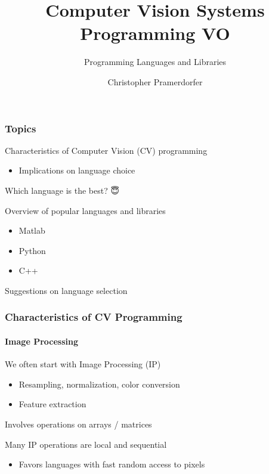 \documentclass[xetex,professionalfont]{beamer}
\title{Computer Vision Systems Programming VO}
\subtitle{Programming Languages and Libraries}
\author{Christopher Pramerdorfer}
\institute{Computer Vision Lab, Vienna University of Technology}
\begin{document}

\begin{frame}
\maketitle
\end{frame}


\begin{frame}
\frametitle{Topics}

Characteristics of Computer Vision (CV) programming
\begin{itemize}
	\item Implications on language choice
\end{itemize}

\bigskip
Which language is the best? {\DejaSans 😇}

\bigskip
Overview of popular languages and libraries
\begin{itemize}
	\item Matlab
	\item Python
	\item C++
\end{itemize}

\bigskip
Suggestions on language selection

\end{frame}


\begin{frame}
\frametitle{Characteristics of CV Programming}
\framesubtitle{Image Processing}

We often start with Image Processing (IP)
\begin{itemize}
	\item Resampling, normalization, color conversion
	\item Feature extraction
\end{itemize}

\bigskip
Involves operations on arrays / matrices

\bigskip
Many IP operations are local and sequential
\begin{itemize}
	\item Favors languages with fast random access to pixels %
\end{itemize}

\end{frame}
\end{document}

